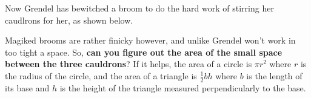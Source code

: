 


Now Grendel has bewitched a broom to do the hard work of stirring her
caudlrons for her, as shown below.

\begin{center}
\end{center}

Magiked brooms are rather finicky however, and unlike Grendel won't work
in too tight a space. So, \textbf{can you figure out the area of the small
space between the three cauldrons}? If it helps, the area of a circle is
\(\pi r^2\) where \(r\) is the radius of the circle, and the area of
a triangle is \(\frac{1}{2}bh\) where \(b\) is the length of its base
and \(h\) is the height of the triangle measured perpendicularly to the base.


